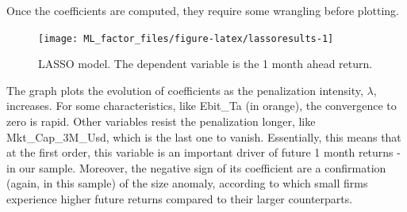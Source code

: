 \documentclass[]{krantz}
\makeatletter
\newenvironment{Shaded}{\begin{snugshade}}{\end{snugshade}}
\newcommand{\CommentTok}[1]{\textcolor[rgb]{0.37,0.37,0.37}{\textit{#1}}}
\newcommand{\DataTypeTok}[1]{\textcolor[rgb]{0.27,0.27,0.27}{#1}}
\newcommand{\DecValTok}[1]{\textcolor[rgb]{0.06,0.06,0.06}{#1}}
\newcommand{\FloatTok}[1]{\textcolor[rgb]{0.06,0.06,0.06}{#1}}
\newcommand{\KeywordTok}[1]{\textcolor[rgb]{0.27,0.27,0.27}{\textbf{#1}}}
\newcommand{\NormalTok}[1]{#1}
\newcommand{\OperatorTok}[1]{\textcolor[rgb]{0.43,0.43,0.43}{\textbf{#1}}}
\newcommand{\StringTok}[1]{\textcolor[rgb]{0.5,0.5,0.5}{#1}}
\newenvironment{kframe}{%
\medskip{}
\setlength{\fboxsep}{.8em}
 \def\at@end@of@kframe{}%
 \ifinner\ifhmode%
  \def\at@end@of@kframe{\end{minipage}}%
  \begin{minipage}{\columnwidth}%
 \fi\fi%
 \def\FrameCommand##1{\hskip\@totalleftmargin \hskip-\fboxsep
 \colorbox{shadecolor}{##1}\hskip-\fboxsep
     \hskip-\linewidth \hskip-\@totalleftmargin \hskip\columnwidth}%
 \MakeFramed {\advance\hsize-\width
   \@totalleftmargin\z@ \linewidth\hsize
   \@setminipage}}%
 {\par\unskip\endMakeFramed%
 \at@end@of@kframe}
\renewenvironment{Shaded}{\begin{kframe}}{\end{kframe}}
\theoremstyle{definition}
\theoremstyle{definition}
\theoremstyle{definition}
\theoremstyle{remark}
\makeatother
\begin{document}
\normalsize

Once the coefficients are computed, they require some wrangling before
plotting.

\footnotesize

\begin{Shaded}
\end{Shaded}

\begin{figure}[H]
\texttt{[image: ML\_factor\_files/figure-latex/lassoresults-1]} \caption{LASSO model. The dependent variable is the 1 month ahead return.}\label{fig:lassoresults}
\end{figure}

\normalsize

The graph plots the evolution of coefficients as the penalization
intensity, \(\lambda\), increases. For some characteristics, like
Ebit\_Ta (in orange), the convergence to zero is rapid. Other variables
resist the penalization longer, like Mkt\_Cap\_3M\_Usd, which is the
last one to vanish. Essentially, this means that at the first order,
this variable is an important driver of future 1 month returns - in our
sample. Moreover, the negative sign of its coefficient are a
confirmation (again, in this sample) of the size anomaly, according to
which small firms experience higher future returns compared to their
larger counterparts.
\end{document}
